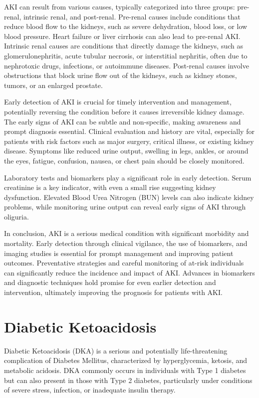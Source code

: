 \documentclass[../main.tex]{subfiles}
\begin{document}
AKI can result from various causes, typically categorized into three groups: pre-renal, intrinsic renal, and post-renal. 
Pre-renal causes include conditions that reduce blood flow to the kidneys, such as severe dehydration, blood loss, or low blood pressure. 
Heart failure or liver cirrhosis can also lead to pre-renal AKI.
Intrinsic renal causes are conditions that directly damage the kidneys, such as glomerulonephritis, acute tubular necrosis, or interstitial nephritis, often due to nephrotoxic drugs, infections, or autoimmune diseases. %
Post-renal causes involve obstructions that block urine flow out of the kidneys, such as kidney stones, tumors, or an enlarged prostate.
 
Early detection of AKI is crucial for timely intervention and management, potentially reversing the condition before it causes irreversible kidney damage. 
The early signs of AKI can be subtle and non-specific, making awareness and prompt diagnosis essential. 
Clinical evaluation and history are vital, especially for patients with risk factors such as major surgery, critical illness, or existing kidney disease. 
Symptoms like reduced urine output, swelling in legs, ankles, or around the eyes, fatigue, confusion, nausea, or chest pain should be closely monitored.

Laboratory tests and biomarkers play a significant role in early detection. 
Serum creatinine is a key indicator, with even a small rise suggesting kidney dysfunction. 
Elevated Blood Urea Nitrogen (BUN) levels can also indicate kidney problems, while monitoring urine output can reveal early signs of AKI through oliguria. 

In conclusion, AKI is a serious medical condition with significant morbidity and mortality. 
Early detection through clinical vigilance, the use of biomarkers, and imaging studies is essential for prompt management and improving patient outcomes. 
Preventative strategies and careful monitoring of at-risk individuals can significantly reduce the incidence and impact of AKI. 
Advances in biomarkers and diagnostic techniques hold promise for even earlier detection and intervention, ultimately improving the prognosis for patients with AKI.


\section{Diabetic Ketoacidosis}
Diabetic Ketoacidosis (DKA) is a serious and potentially life-threatening complication of Diabetes Mellitus, characterized by hyperglycemia, ketosis, and metabolic acidosis. 
DKA commonly occurs in individuals with Type 1 diabetes but can also present in those with Type 2 diabetes, particularly under conditions of severe stress, infection, or inadequate insulin therapy. 
\end{document}
